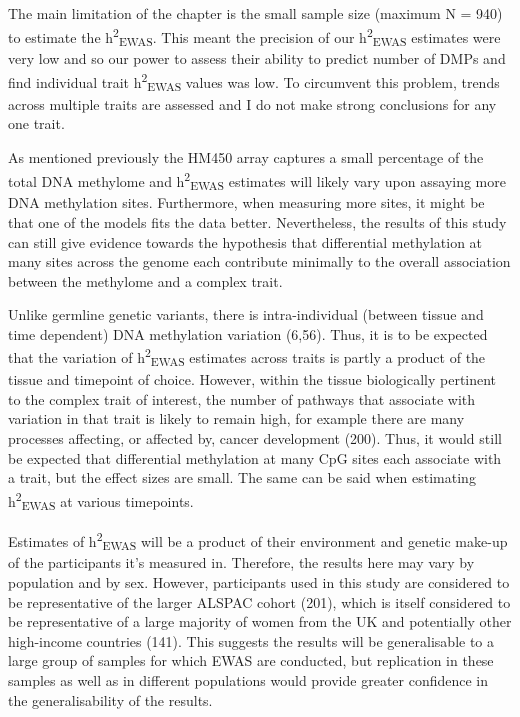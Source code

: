 \documentclass[11pt,twoside]{bristolthesis}
\begin{document}
The main limitation of the chapter is the small sample size (maximum N = 940) to estimate the h\textsuperscript{2}\textsubscript{EWAS}. This meant the precision of our h\textsuperscript{2}\textsubscript{EWAS} estimates were very low and so our power to assess their ability to predict number of DMPs and find individual trait h\textsuperscript{2}\textsubscript{EWAS} values was low. To circumvent this problem, trends across multiple traits are assessed and I do not make strong conclusions for any one trait.

As mentioned previously the HM450 array captures a small percentage of the total DNA methylome and h\textsuperscript{2}\textsubscript{EWAS} estimates will likely vary upon assaying more DNA methylation sites. Furthermore, when measuring more sites, it might be that one of the models fits the data better. Nevertheless, the results of this study can still give evidence towards the hypothesis that differential methylation at many sites across the genome each contribute minimally to the overall association between the methylome and a complex trait.

Unlike germline genetic variants, there is intra-individual (between tissue and time dependent) DNA methylation variation (6,56). Thus, it is to be expected that the variation of h\textsuperscript{2}\textsubscript{EWAS} estimates across traits is partly a product of the tissue and timepoint of choice. However, within the tissue biologically pertinent to the complex trait of interest, the number of pathways that associate with variation in that trait is likely to remain high, for example there are many processes affecting, or affected by, cancer development (200). Thus, it would still be expected that differential methylation at many CpG sites each associate with a trait, but the effect sizes are small. The same can be said when estimating h\textsuperscript{2}\textsubscript{EWAS} at various timepoints.

Estimates of h\textsuperscript{2}\textsubscript{EWAS} will be a product of their environment and genetic make-up of the participants it's measured in. Therefore, the results here may vary by population and by sex. However, participants used in this study are considered to be representative of the larger ALSPAC cohort (201), which is itself considered to be representative of a large majority of women from the UK and potentially other high-income countries (141). This suggests the results will be generalisable to a large group of samples for which EWAS are conducted, but replication in these samples as well as in different populations would provide greater confidence in the generalisability of the results.
\end{document}
